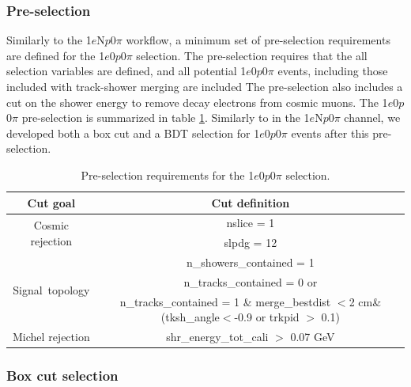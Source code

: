 \documentclass[a4paper]{article}
\newcommand{\npsel}{1$e$N$p$0$\pi$ }
\newcommand{\zpsel}{1$e$0$p$0$\pi$ }
\begin{document}
\subsubsection{Pre-selection}
Similarly to the \npsel workflow, a minimum set of pre-selection requirements are defined for the \zpsel selection.  The pre-selection requires that the all selection variables are defined, and all potential \zpsel events, including those included with track-shower merging are included %
The pre-selection also includes a cut on the shower energy to remove decay electrons from cosmic muons. 
The \zpsel pre-selection is summarized in table \ref{tab:1e0p:presel}. Similarly to in the \npsel channel, we developed both a box cut and a BDT selection for \zpsel events after this pre-selection.

\begin{table}[h!]
\centering
\setlength{\tabcolsep}{10pt}
\renewcommand{\arraystretch}{1.25}
 \begin{tabular}{| c | c |} 
 \hline
 Cut goal & Cut definition \\
 \hline\hline
\multirow{2}{*}{Cosmic rejection} & nslice = 1 \\
 & slpdg = 12 \\
 \hline
\multirow{3}{*}{Signal~topology} & n\_showers\_contained = 1 \\
 & n\_tracks\_contained = 0 or \\ &n\_tracks\_contained = 1 \& merge\_bestdist $<$2 cm\& (tksh\_angle$<$-0.9 or trkpid $>$ 0.1) \\
 \hline
Michel rejection & shr\_energy\_tot\_cali $>$ 0.07 GeV \\
 \hline
 \end{tabular}
 \caption{\label{tab:1e0p:presel} Pre-selection requirements for the \zpsel selection.}
\end{table}




\subsubsection{Box cut selection}
\end{document}
